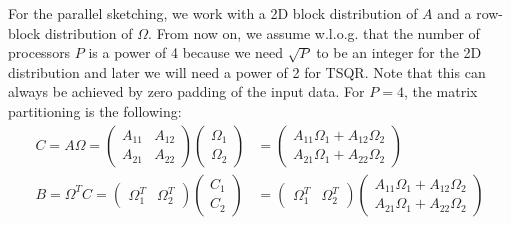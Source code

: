 \documentclass{article}
\theoremstyle{definition}
\begin{document}
For the parallel sketching, we work with a 2D block distribution of $A$ and a row-block distribution of $\Omega$. From now on, we assume w.l.o.g. that the number of processors $P$ is a power of 4 because we need $\sqrt{P}$ to be an integer for the 2D distribution and later we will need a power of 2 for TSQR. Note that this can always be achieved by zero padding of the input data. For $P=4$, the matrix partitioning is the following:
\begin{align*}
    C = A \Omega 
    = \begin{pmatrix}
        A_{11} & A_{12} \\
        A_{21} & A_{22}
    \end{pmatrix}
    \begin{pmatrix}
        \Omega_1 \\
        \Omega_2
    \end{pmatrix}
    &= \begin{pmatrix}
        A_{11} \Omega_1 + A_{12} \Omega_2 \\
        A_{21} \Omega_1 + A_{22} \Omega_2
    \end{pmatrix}
    \\
    B = \Omega^T C
    = \begin{pmatrix}
        \Omega_1^T & \Omega_2^T
    \end{pmatrix}
    \begin{pmatrix}
        C_1 \\
        C_2
    \end{pmatrix}
    &= \begin{pmatrix}
        \Omega_1^T & \Omega_2^T
    \end{pmatrix}
    \begin{pmatrix}
        A_{11} \Omega_1 + A_{12} \Omega_2 \\
        A_{21} \Omega_1 + A_{22} \Omega_2
    \end{pmatrix}
\end{align*}
\end{document}
